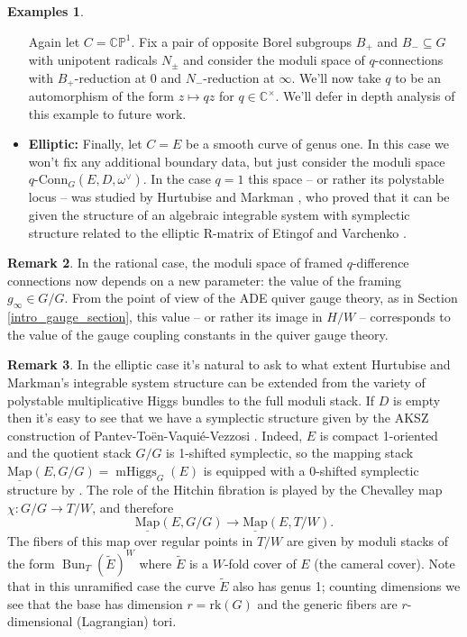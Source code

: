 \documentclass[11pt, oneside, reqno]{amsart}
\theoremstyle{definition} \newtheorem{definition}{Definition}[section]
\theoremstyle{definition} \newtheorem{remark}[definition]{Remark}
\theoremstyle{definition} \newtheorem{remarks}[definition]{Remarks}
\theoremstyle{definition} \newtheorem{question}[definition]{Question}
\theoremstyle{definition} \newtheorem*{note}{Note}
\theoremstyle{definition} \newtheorem{example}[definition]{Example}
\theoremstyle{definition} \newtheorem{examples}[definition]{Examples}
\newcommand{\bb}[1]{\mathbb{#1}}
\newcommand{\mr}[1]{\mathrm{#1}}
\newcommand{\wt}[1]{\widetilde{#1}}
\newcommand{\ul}[1]{\underline{#1}}
\newcommand{\CC}{\mathbb{C}}
\newcommand{\sub}{\subseteq}
\DeclareMathOperator{\bun}{Bun}
\DeclareMathOperator{\mhiggs}{mHiggs}
\newcommand{\map}{\ul{\mr{Map}}}
\newcommand{\qconn}{q\text{-Conn}}
\begin{document}
\begin{examples}
\begin{itemize}
  Again let $C = \bb{CP}^1$.  Fix a pair of opposite Borel subgroups $B_+$ and $B_- \sub G$ with unipotent radicals $N_\pm$ and consider the moduli space of $q$-connections with $B_+$-reduction at $0$ and $N_-$-reduction at $\infty$.  We'll now take $q$ to be an automorphism of the form $z \mapsto qz$ for $q \in \CC^\times$.  We'll defer in depth analysis of this example to future work.
  
  \item \textbf{Elliptic:} Finally, let $C = E$ be a smooth curve of genus one.  In this case we won't fix any additional boundary data, but just consider the moduli space $\qconn_G(E,D, \omega^\vee)$.  In the case $q = 1$ this space -- or rather its polystable locus -- was studied by Hurtubise and Markman \cite{HurtubiseMarkman}, who proved that it can be given the structure of an algebraic integrable system with symplectic structure related to the elliptic R-matrix of Etingof and Varchenko \cite{EtingofVarchenko}.
 \end{itemize}
\end{examples}

\begin{remark}
In the rational case, the moduli space of framed $q$-difference connections now depends on a new parameter: the value of the framing $g_\infty \in G/G$.  From the point of view of the ADE quiver gauge theory, as in Section \ref{intro_gauge_section}, this value -- or rather its image in $H/W$ -- corresponds to the value of the gauge coupling constants in the quiver gauge theory.
\end{remark}

\begin{remark} \label{Elliptic_AKSZ_remark}
In the elliptic case it's natural to ask to what extent Hurtubise and Markman's integrable system structure can be extended from the variety of polystable multiplicative Higgs bundles to the full moduli stack.  If $D$ is empty then it's easy to see that we have a symplectic structure given by the AKSZ construction of Pantev-To\"en-Vaqui\'e-Vezzosi \cite{PTVV}.  Indeed, $E$ is compact 1-oriented and the quotient stack $G/G$ is 1-shifted symplectic, so the mapping stack $\map(E, G/G) = \mhiggs_G(E)$ is equipped with a 0-shifted symplectic structure by \cite[Theorem 2.5]{PTVV}.  The role of the Hitchin fibration is played by the Chevalley map $\chi \colon G/G \to T/W$, and therefore
\[\map(E,G/G) \to \map(E,T/W).\]
The fibers of this map over regular points in $T/W$ are given by moduli stacks of the form $\bun_T(\wt E)^W$ where $\wt E$ is a $W$-fold cover of $E$ (the cameral cover).  Note that in this unramified case the curve $\wt E$ also has genus 1; counting dimensions we see that the base has dimension $r = \mr{rk}(G)$ and the generic fibers are $r$-dimensional (Lagrangian) tori.
\end{remark}
\end{document}
